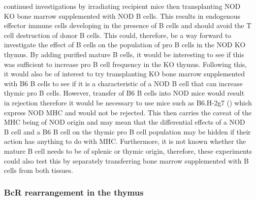 \citet{Serreze1998} continued investigations by irradiating recipient mice then transplanting NOD KO bone marrow supplemented with NOD B cells.
This results in endogenous effector immune cells developing in the presence of B cells and should avoid the T cell destruction of donor B cells.
This could, therefore, be a way forward to investigate the effect of B cells on the population of pro B cells in the NOD KO thymus.
By adding purified mature B cells, it would be interesting to see if this was sufficient to increase pro B cell frequency in the KO thymus.
Following this, it would also be of interest to try transplanting KO bone marrow supplemented with B6 B cells to see if it is a characteristic of a NOD B cell that can increase thymic pro B cells.
However, transfer of B6 B cells into NOD mice would result in rejection therefore it would be necessary to use mice such as B6.H-2g7 (\citep{Gonzalez1997}) which express NOD MHC and would not be rejected. This then carries the caveat of the MHC being of NOD origin and may mean that the differential effects of a NOD B cell and a B6 B cell on the thymic pro B cell population may be hidden if their action has anything to do with MHC.
Furthermore, it is not known whether the mature B cell needs to be of splenic or thymic origin, therefore, these experiments could also test this by separately transferring bone marrow supplemented with B cells from both tissues.

\subsubsection{BcR rearrangement in the thymus}


